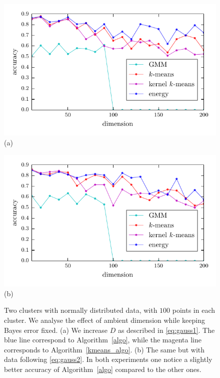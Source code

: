 \documentclass[aps,preprint,nofootinbib,floatfix]{revtex4-1}
\begin{document}
\begin{figure}
\begin{minipage}{0.49\textwidth}
\centering
\includegraphics[width=1\textwidth]{gauss_dim.pdf}\\[-.8em]
(a)
\end{minipage}
\begin{minipage}{0.49\textwidth}
\centering
\includegraphics[width=1\textwidth]{gauss_cov.pdf}\\[-.8em]
(b)
\end{minipage}
\caption{
\label{fig:gauss}
Two clusters with normally distributed data, with $100$ points in each
cluster. We analyse the effect of ambient dimension while keeping Bayes
error fixed.
(a) 
We increase $D$ as described in \eqref{eq:gauss1}. The blue
line correspond to Algorithm~\ref{algo}, while
the magenta line 
corresponds to Algorithm~\ref{kmeans_algo}.
(b) The same but with data following \eqref{eq:gauss2}.
In both experiments one notice a slightly better accuracy
of Algorithm~\ref{algo} compared to the other ones.
}
\end{figure}
\end{document}
